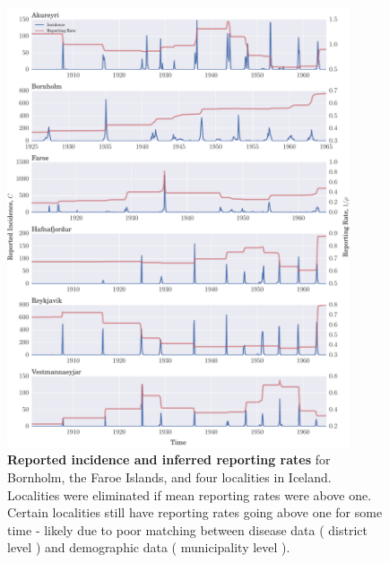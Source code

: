 \documentclass[10pt]{article}
\begin{document}
\begin{figure}[H]
\label{fig_timeseries}
\caption{\textbf{Reported incidence and inferred reporting rates} for Bornholm, the Faroe Islands, and four localities in Iceland. Localities were eliminated if mean reporting rates were above one. Certain localities still have reporting rates going above one for some time - likely due to poor matching between disease data ( district level ) and demographic data ( municipality level ).}
\centering
\includegraphics[width=0.9\textwidth]{figures/0_incidence.pdf}
\end{figure}
\end{document}
